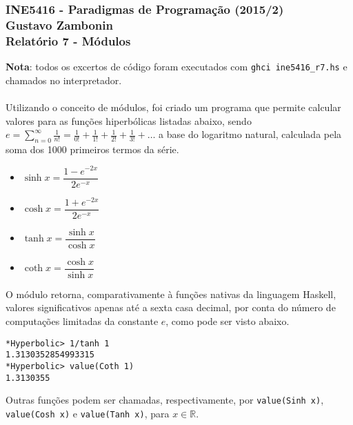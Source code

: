 \documentclass{article}
\begin{document}
\subsubsection*{INE5416 - Paradigmas de Programação (2015/2) \\
    Gustavo Zambonin \\
    Relatório 7 - Módulos
}

\textbf{Nota}: todos os excertos de código foram executados com
\texttt{ghci ine5416\_r7.hs} e chamados no interpretador. \\ \\
Utilizando o conceito de módulos, foi criado um programa que
permite calcular valores para as funções hiperbólicas listadas abaixo,
sendo $e = \sum\limits_{n=0}^\infty \frac{1}{n!} = \frac{1}{0!} +
\frac{1}{1!} + \frac{1}{2!} + \frac{1}{3!} + \dots$ a base do logaritmo
natural, calculada pela soma dos 1000 primeiros termos da série.
\begin{itemize}
    \item $\sinh x = \dfrac{1 - e^{-2x}}{2e^{-x}}$
    \item $\cosh x = \dfrac{1 + e^{-2x}}{2e^{-x}}$
    \item $\tanh x = \dfrac{\sinh x}{\cosh x}$
    \item $\coth x = \dfrac{\cosh x}{\sinh x}$
\end{itemize}
O módulo retorna, comparativamente à funções nativas da linguagem Haskell,
valores significativos apenas até a sexta casa decimal, por conta do
número de computações limitadas da constante $e$, como pode ser
visto abaixo.

\begin{verbatim}
*Hyperbolic> 1/tanh 1
1.3130352854993315
*Hyperbolic> value(Coth 1)
1.3130355
\end{verbatim}
Outras funções podem ser chamadas, respectivamente, por
\texttt{value(Sinh x)}, \texttt{value(Cosh x)} e \texttt{value(Tanh x)},
para $x \in \mathbb{R}$.
\end{document}
